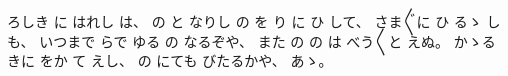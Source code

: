 %
ろしき
に
はれし
は、
%
の
と
なりし
の
を
り
に
ひ
して、
%
さま〴〵に
ひ
るゝ%
しも、
%
いつまで
らで
ゆる
の
なるぞや、
%
また
の
の
は
べう〳〵と
えぬ。
%
かゝる%
きに
をか
て
えし、
%
の
にても
びたるかや、
%
あゝ。%
